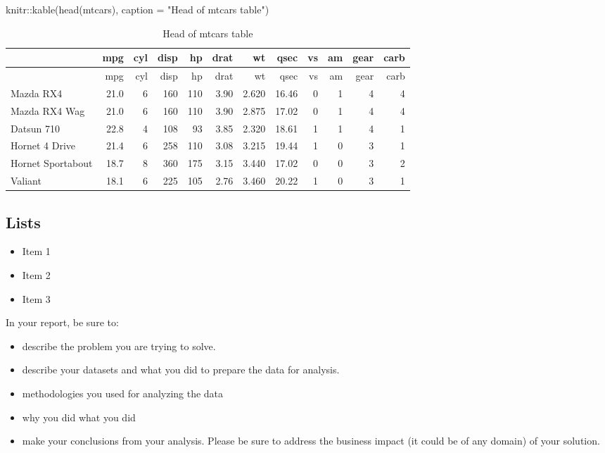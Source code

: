 \documentclass{article}
\newenvironment{Shaded}{\begin{snugshade}}{\end{snugshade}}
\newcommand{\AttributeTok}[1]{\textcolor[rgb]{0.77,0.63,0.00}{#1}}
\newcommand{\FunctionTok}[1]{\textcolor[rgb]{0.00,0.00,0.00}{#1}}
\newcommand{\NormalTok}[1]{#1}
\newcommand{\SpecialCharTok}[1]{\textcolor[rgb]{0.00,0.00,0.00}{#1}}
\newcommand{\StringTok}[1]{\textcolor[rgb]{0.31,0.60,0.02}{#1}}
\begin{document}
\begin{Shaded}
\begin{Highlighting}[]
\NormalTok{knitr}\SpecialCharTok{::}\FunctionTok{kable}\NormalTok{(}\FunctionTok{head}\NormalTok{(mtcars), }\AttributeTok{caption =} \StringTok{"Head of mtcars table"}\NormalTok{)}
\end{Highlighting}
\end{Shaded}

\begin{longtable}[]{@{}lrrrrrrrrrrr@{}}
\caption{Head of mtcars table}\tabularnewline
\toprule
& mpg & cyl & disp & hp & drat & wt & qsec & vs & am & gear &
carb\tabularnewline
\midrule
\endfirsthead
\toprule
& mpg & cyl & disp & hp & drat & wt & qsec & vs & am & gear &
carb\tabularnewline
\midrule
\endhead
Mazda RX4 & 21.0 & 6 & 160 & 110 & 3.90 & 2.620 & 16.46 & 0 & 1 & 4 &
4\tabularnewline
Mazda RX4 Wag & 21.0 & 6 & 160 & 110 & 3.90 & 2.875 & 17.02 & 0 & 1 & 4
& 4\tabularnewline
Datsun 710 & 22.8 & 4 & 108 & 93 & 3.85 & 2.320 & 18.61 & 1 & 1 & 4 &
1\tabularnewline
Hornet 4 Drive & 21.4 & 6 & 258 & 110 & 3.08 & 3.215 & 19.44 & 1 & 0 & 3
& 1\tabularnewline
Hornet Sportabout & 18.7 & 8 & 360 & 175 & 3.15 & 3.440 & 17.02 & 0 & 0
& 3 & 2\tabularnewline
Valiant & 18.1 & 6 & 225 & 105 & 2.76 & 3.460 & 20.22 & 1 & 0 & 3 &
1\tabularnewline
\bottomrule
\end{longtable}

\hypertarget{lists}{%
\subsection{Lists}\label{lists}}

\begin{itemize}
\tightlist
\item
  Item 1
\item
  Item 2
\item
  Item 3
\end{itemize}

In your report, be sure to:

\begin{itemize}
\item
  describe the problem you are trying to solve.
\item
  describe your datasets and what you did to prepare the data for
  analysis.
\item
  methodologies you used for analyzing the data
\item
  why you did what you did
\item
  make your conclusions from your analysis. Please be sure to address
  the business impact (it could be of any domain) of your solution.
\end{itemize}
\end{document}
